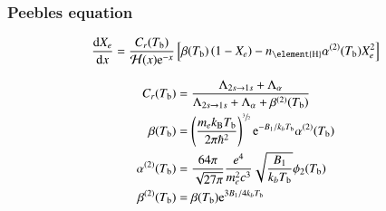 \subsubsection{Peebles equation}\label{mil2:theo:sec:Peebles}
    \begin{equation}\label{mil2:theo:eq:Peebles}
        \dv{X_e}{x} = \frac{C_r(T\ped{b})}{\Hp(x)\eu^{-x}} \left[ \beta(T\ped{b}) \left(1-X_e\right) - n\ped{\element{H}} \alpha^{(2)}(T\ped{b})X_e^2 \right]
    \end{equation}

    \begin{subequations}
        \begin{align}
            C_r(T_\mathrm{b}) &= \frac{\Lambda_{2s\to 1s}+ \Lambda_{\alpha}}{\Lambda_{2s\to 1s} + \Lambda_\alpha + \beta^{(2)}(T_\mathrm{b})} \\
            \beta (T_\mathrm{b}) &= \left(\frac{m_e k_\mathrm{B}T_\mathrm{b}}{2\pi \hbar^2} \right)^{\sfrac{3}{2}} \mathrm{e}^{-B_1/k_b T_\mathrm{b}} \alpha^{(2)}(T_\mathrm{b}) \\
            \alpha^{(2)}(T_\mathrm{b}) &= \frac{64 \pi}{\sqrt{27\pi}} \frac{e^4}{m_e^2c^3} \sqrt{\frac{B_1}{k_b T_\mathrm{b}}} \phi_2(T_\mathrm{b}) \\
            \beta^{(2)}(T_\mathrm{b}) &= \beta(T_\mathrm{b})\mathrm{e}^{3B_1 /4k_b T_\mathrm{b}}
        \end{align}
    \end{subequations}